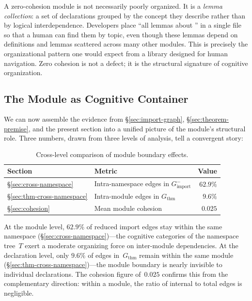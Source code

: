 \begin{remark}
\label{rem:zero-cohesion}
A zero-cohesion module is not necessarily poorly organized. It is a \emph{lemma collection}: a set of declarations grouped by the concept they describe rather than by logical interdependence. Developers place ``all lemmas about '' in a single file so that a human can find them by topic, even though these lemmas depend on definitions and lemmas scattered across many other modules. This is precisely the organizational pattern one would expect from a library designed for human navigation. Zero cohesion is not a defect; it is the structural signature of cognitive organization.
\end{remark}

\subsection{The Module as Cognitive Container}
\label{sec:cognitive-container}

We can now assemble the evidence from \S\ref{sec:import-graph}, \S\ref{sec:theorem-premise}, and the present section into a unified picture of the module's structural role. Three numbers, drawn from three levels of analysis, tell a convergent story:

\begin{table}[ht]
\centering
\caption{Cross-level comparison of module boundary effects.}
\label{tab:cross-level}
\begin{tabular}{llr}
\toprule
Section & Metric & Value \\
\midrule
\S\ref{sec:cross-namespace} & Intra-namespace edges in $G_{\mathrm{import}}^{-}$ & $62.9\%$ \\
\S\ref{sec:thm-cross-namespace} & Intra-module edges in $G_{\mathrm{thm}}$ & $9.6\%$ \\
\S\ref{sec:cohesion} & Mean module cohesion & $0.025$ \\
\bottomrule
\end{tabular}
\end{table}

At the module level, $62.9\%$ of reduced import edges stay within the same namespace (\S\ref{sec:cross-namespace})---the cognitive categories of the namespace tree~$T$ exert a moderate organizing force on inter-module dependencies. At the declaration level, only $9.6\%$ of edges in~$G_{\mathrm{thm}}$ remain within the same module (\S\ref{sec:thm-cross-namespace})---the module boundary is nearly invisible to individual declarations. The cohesion figure of~$0.025$ confirms this from the complementary direction: within a module, the ratio of internal to total edges is negligible.

